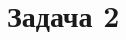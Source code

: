 \documentclass[a4paper]{article}
\newcommand{\peq}{\mathrel{+}=}
\newcommand{\deq}{\mathrel{:}=}
\begin{document}
\section*{Задача 2}
\end{document}
